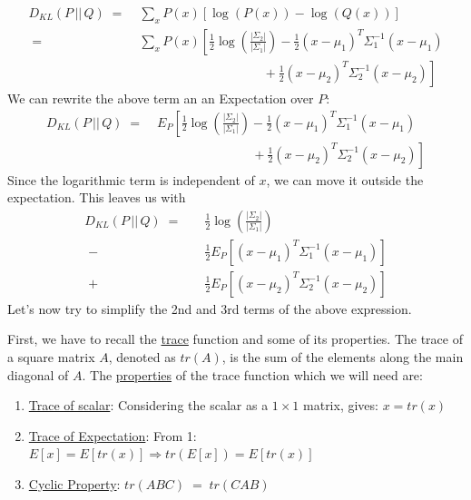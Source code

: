 \documentclass[12pt]{report}
\begin{document}
\begin{align*}
    D_{KL} (P \,||\, Q)
    \;=&\; \sum_x P(x) \left[\log(P(x)) - \log(Q(x)) \right] \\
    \;=&\; \sum_x P(x) \left[ \frac{1}{2}\log\left(\frac{|\Sigma_2|}{|\Sigma_1|}\right)
        - \frac{1}{2}(x-\mu_1)^T\Sigma_1^{-1} (x - \mu_1) \right. \\
       &\left.\qquad\qquad\qquad\qquad\quad\;\;\;\,
        + \frac{1}{2}(x-\mu_2)^T\Sigma_2^{-1} (x - \mu_2)\right]
\end{align*}
We can rewrite the above term an an Expectation over $P$:
\begin{align*}
    D_{KL} (P \,||\, Q)
    \;=&\; E_P \left[ \frac{1}{2}\log\left(\frac{|\Sigma_2|}{|\Sigma_1|}\right)
        - \frac{1}{2}(x-\mu_1)^T\Sigma_1^{-1} (x - \mu_1) \right. \\
       &\left.\qquad\qquad\qquad\quad\;\;\,
        + \frac{1}{2}(x-\mu_2)^T\Sigma_2^{-1} (x - \mu_2)\right]
\end{align*}
Since the logarithmic term is independent of $x$, we can move it outside the
expectation. This leaves us with
\begin{align*}
    D_{KL} (P \,||\, Q)
    \;=\quad &\frac{1}{2}\log\left(\frac{|\Sigma_2|}{|\Sigma_1|}\right) \\
       \; -\, &\frac{1}{2} E_P \left[ (x-\mu_1)^T\Sigma_1^{-1} (x - \mu_1) \right] \\
       \; +\, &\frac{1}{2} E_P \left[ (x-\mu_2)^T\Sigma_2^{-1} (x - \mu_2) \right]
\end{align*}
Let's now try to simplify the 2nd and 3rd terms of the above expression.
\bigskip

\noindent First, we have to recall the
\href{https://en.wikipedia.org/wiki/Trace_(linear_algebra)}{trace}
function and some of its properties. The trace of a square matrix $A$,
denoted as $tr(A)$, is the sum of the elements along the main diagonal of $A$.
The \href{https://en.wikipedia.org/wiki/Trace_(linear_algebra)#Properties}{properties}
of the trace function which we will need are:
\begin{enumerate}
    \item \href{https://math.stackexchange.com/questions/3098841/how-could-a-scalar-
        be-equal-to-the-trace-of-the-same-scalar}{Trace of scalar}:
        Considering the scalar as a $1\times1$ matrix, gives: $x = tr(x)$
    \item \href{https://math.stackexchange.com/questions/2228398/trace-trick-for-
        expectations-of-quadratic-forms}{Trace of Expectation}:
        From 1: $E[x] = E[tr(x)] \Rightarrow tr(E[x]) = E[tr(x)]$
    \item \href{https://en.wikipedia.org/wiki/Trace_(linear_algebra)#Cyclic_property}
        {Cyclic Property}: $tr(ABC) \;=\; tr(CAB)$
\end{enumerate}
\clearpage
\end{document}
